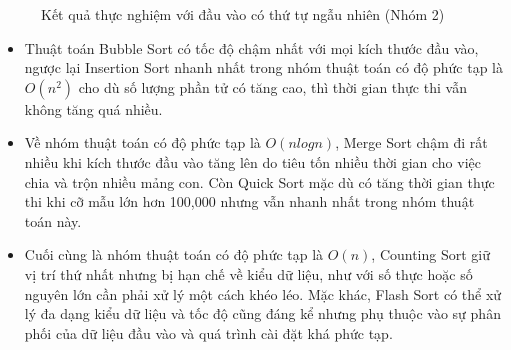 \begin{figure}[H]
\caption{Kết quả thực nghiệm với đầu vào có thứ tự ngẫu nhiên (Nhóm 2)}
\end{figure}

\begin{itemize}[label=$\circ$]
    \item Thuật toán Bubble Sort có tốc độ chậm nhất với mọi kích thước 
    đầu vào, ngược lại Insertion Sort nhanh nhất trong nhóm thuật toán 
    có độ phức tạp là $O\left(n^2\right)$ cho dù số lượng phần tử có tăng 
    cao, thì thời gian thực thi vẫn không tăng quá nhiều. 
    \item Về nhóm thuật toán có độ phức tạp là $O\left(nlogn\right)$, 
    Merge Sort chậm đi rất nhiều khi kích thước đầu vào tăng lên do tiêu 
    tốn nhiều thời gian cho việc chia và trộn nhiều mảng con. Còn Quick 
    Sort mặc dù có tăng thời gian thực thi khi cỡ mẫu lớn hơn 100,000 
    nhưng vẫn nhanh nhất trong nhóm thuật toán này. 
    \item Cuối cùng là nhóm thuật toán có độ phức tạp là $O\left(n\right)$, 
    Counting Sort giữ vị trí thứ nhất nhưng bị hạn chế về kiểu dữ liệu, 
    như với số thực hoặc số nguyên lớn cần phải xử lý một cách khéo léo. 
    Mặc khác, Flash Sort có thể xử lý đa dạng kiểu dữ liệu và tốc độ cũng 
    đáng kể nhưng phụ thuộc vào sự phân phối của dữ liệu đầu vào và quá 
    trình cài đặt khá phức tạp.
\end{itemize}


